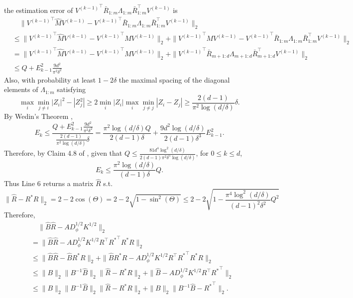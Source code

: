the estimation error of ${V^{(k-1)}}^\top\bar{R}_{1:m}\Lambda_{1:m} \bar{R}_{1:m}^{\top} V^{(k-1)}$ is 
\begin{align*}
& \quad \| {V^{(k-1)}}^\top \hat{M}V^{(k-1)} - {V^{(k-1)}}^\top\bar{R}_{1:m}\Lambda_{1:m} \bar{R}_{1:m}^{\top} V^{(k-1)} \|_2 \\
& \le \|{V^{(k-1)}}^\top \hat{M}V^{(k-1)} - {V^{(k-1)}}^\top MV^{(k-1)}\|_2 + \| {V^{(k-1)}}^\top MV^{(k-1)} -{V^{(k-1)}}^\top\bar{R}_{1:m}\Lambda_{1:m} \bar{R}_{1:m}^{\top} V^{(k-1)} \|_2 \\
&  = \|{V^{(k-1)}}^\top \hat{M}V^{(k-1)} - {V^{(k-1)}}^\top MV^{(k-1)}\|_2 + \|{V^{(k-1)}}^\top\bar{R}_{m+1:d}\Lambda_{m+1:d}\bar{R}_{m+1:d}^{\top} V^{(k-1)} \|_2 \\
& \le Q + E_{k-1}^2 \frac{9d^2}{\pi^2\delta^2} 
\end{align*}
Also, with probability at least $1-2\delta$ the maximal spacing of the diagonal elements of $\Lambda_{1:m}$ satisfying
\[
\max_i\min_{j\neq i} |Z_i|^2 - |Z_j^2| \ge 2\min_i |Z_i| \max_i\min_{j\neq j} |Z_i - Z_j| \ge \frac{2(d-1)}{\pi^2 \log(d/\delta)}\delta.
\] 
By Wedin's Theorem \citep{stewart1990matrix}, 
\[
E_k \le \frac{Q + E_{k-1}^2 \frac{9d^2}{\pi^2\delta^2} }{\frac{2(d-1)}{\pi^2 \log(d/\delta)}\delta} = \frac{\pi^2 \log(d/\delta)Q}{2(d-1)\delta} + \frac{9d^2 \log(d/\delta)}{2(d-1)\delta^3}E_{k-1}^2.
\]
Therefore, by Claim 4.8 of \citet{vempala2014max}, given that $Q\le  \frac{81d^4\log^2(d/\delta)}{2(d-1)\pi^2\delta^5\log(d/\delta)}$, for $0\le k\le d$,
\[
E_k \le \frac{\pi^2 \log(d/\delta)}{(d-1)\delta} Q. 
\]
Thus Line 6 returns a matrix $\hat{R}$ s.t.
\[
\|\hat{R} - R^*R\|_2 = 2-2\cos(\Theta)= 2 - 2\sqrt{1-\sin^2(\Theta)} \le 2 - 2\sqrt{1-\frac{\pi^4 \log^2(d/\delta)}{(d-1)^2\delta^2} Q^2}
\]
Therefore,
\begin{align*}
& \quad \| \hat{B}\hat{R} - AD_{\phi}^{1/2}K^{1/2}\|_2 \\
& = \| \hat{B}\hat{R} - AD_{\phi}^{1/2}K^{1/2}R^{\top}{R^*}^{\top}R^*R\|_2 \\
& \le \| \hat{B}\hat{R} -  \hat{B}R^*R\|_2 + \|\hat{B}R^*R - AD_{\phi}^{1/2}K^{1/2}R^{\top}{R^*}^{\top}R^*R \|_2 \\
& \le \|B\|_2\|B^{-1}\hat{B}\|_2\|\hat{R} - R^*R\|_2 + \|\hat{B} - AD_{\phi}^{1/2}K^{1/2}R^{\top}{R^*}^{\top}\|_2 \\
& \le  \|B\|_2\|B^{-1}\hat{B}\|_2\|\hat{R} - R^*R\|_2 +\|B\|_2\|B^{-1}\hat{B} - {R^*}^{\top}\|_2.
\end{align*}


